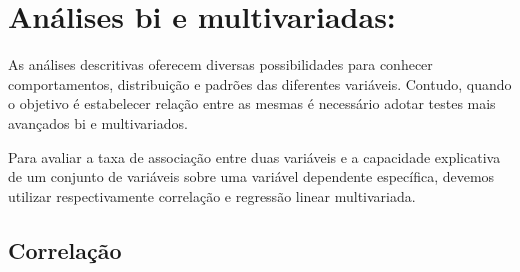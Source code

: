 \documentclass[
  10pt,
  brazil,
  a4paper,
  twoside, notitlepage, openright]{book}
\newenvironment{Shaded}{\begin{snugshade}}{\end{snugshade}}
\newcommand{\CommentTok}[1]{\textcolor[rgb]{0.56,0.35,0.01}{\textit{#1}}}
\newcommand{\DataTypeTok}[1]{\textcolor[rgb]{0.13,0.29,0.53}{#1}}
\newcommand{\KeywordTok}[1]{\textcolor[rgb]{0.13,0.29,0.53}{\textbf{#1}}}
\newcommand{\NormalTok}[1]{#1}
\newcommand{\OperatorTok}[1]{\textcolor[rgb]{0.81,0.36,0.00}{\textbf{#1}}}
\newcommand{\OtherTok}[1]{\textcolor[rgb]{0.56,0.35,0.01}{#1}}
\newcommand{\StringTok}[1]{\textcolor[rgb]{0.31,0.60,0.02}{#1}}
\begin{document}
\begin{Shaded}
\end{Shaded}

\hypertarget{anuxe1lises-bi-e-multivariadas}{%
\section{Análises bi e multivariadas:}\label{anuxe1lises-bi-e-multivariadas}}

As análises descritivas oferecem diversas possibilidades para conhecer comportamentos, distribuição e padrões das diferentes variáveis. Contudo, quando o objetivo é estabelecer relação entre as mesmas é necessário adotar testes mais avançados bi e multivariados.

Para avaliar a taxa de associação entre duas variáveis e a capacidade explicativa de um conjunto de variáveis sobre uma variável dependente específica, devemos utilizar respectivamente correlação e regressão linear multivariada.

\hypertarget{correlauxe7uxe3o}{%
\subsection{Correlação}\label{correlauxe7uxe3o}}
\end{document}
